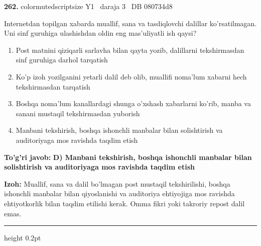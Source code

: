 \documentclass[10pt,a4paper,oneside]{article}
\begin{document}
\noindent\textbf{\color{ink}262.}  {color{muted}scriptsize Y1 \textbullet\ daraja 3 \textbullet\ DB 080734d8}
\par
Internetdan topilgan xabarda muallif, sana va tasdiqlovchi dalillar ko'rsatilmagan. Uni sinf guruhiga ulashishdan oldin eng mas'uliyatli ish qaysi?
\begin{enumerate}[label=\Alph*),leftmargin=9mm]
\item Post matnini qiziqarli sarlavha bilan qayta yozib, dalillarni tekshirmasdan sinf guruhiga darhol tarqatish
\item Ko'p izoh yozilganini yetarli dalil deb olib, muallifi noma'lum xabarni hech tekshirmasdan tarqatish
\item Boshqa noma'lum kanallardagi shunga o'xshash xabarlarni ko'rib, manba va sanani mustaqil tekshirmasdan yuborish
\item Manbani tekshirish, boshqa ishonchli manbalar bilan solishtirish va auditoriyaga mos ravishda taqdim etish
\end{enumerate}
\begin{tcolorbox}[enhanced,breakable,colback=teal!4,colframe=teal!50!black,boxrule=0.5pt,arc=1.1mm,left=3mm,right=3mm,top=1.7mm,bottom=1.7mm,before skip=2mm,after skip=2mm]
\textbf{\color{teal}To'g'ri javob:} \textbf{D) Manbani tekshirish, boshqa ishonchli manbalar bilan solishtirish va auditoriyaga mos ravishda taqdim etish}
\par\smallskip
\textbf{Izoh:} Muallif, sana va dalil bo'lmagan post mustaqil tekshirilishi, boshqa ishonchli manbalar bilan qiyoslanishi va auditoriya ehtiyojiga mos ravishda ehtiyotkorlik bilan taqdim etilishi kerak. Omma fikri yoki takroriy repost dalil emas.
\end{tcolorbox}
\vspace{2mm}\hrule height 0.2pt \vspace{3mm}
\end{document}
